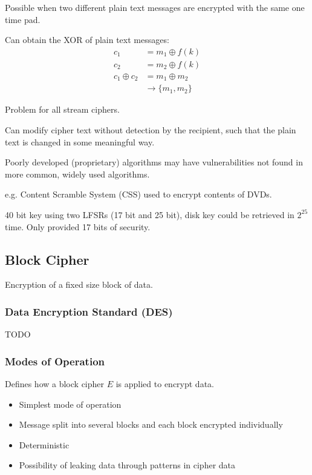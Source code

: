 \documentclass[a4paper]{article}
\begin{document}

Possible when two different plain text messages are encrypted with the same one
time pad.

Can obtain the XOR of plain text messages:
\begin{align*}
               c_{1} &= m_{1} \oplus f(k) \\
               c_{2} &= m_{2} \oplus f(k) \\
  c_{1} \oplus c_{2} &= m_{1} \oplus m_{2} \\
                     &\rightarrow \{m_{1}, m_{2}\}
\end{align*}


Problem for all stream ciphers.

Can modify cipher text without detection by the recipient, such that the plain
text is changed in some meaningful way.


Poorly developed (proprietary) algorithms may have vulnerabilities not found in
more common, widely used algorithms.

e.g. Content Scramble System (CSS) used to encrypt contents of DVDs.

40 bit key using two LFSRs (17 bit and 25 bit), disk key could be retrieved in
$2^{25}$ time. Only provided 17 bits of security.

\subsection{Block Cipher}

Encryption of a fixed size block of data.

\subsubsection{Data Encryption Standard (DES)}

TODO

\subsubsection{Modes of Operation}

Defines how a block cipher $E$ is applied to encrypt data.


\begin{itemize}
  \item Simplest mode of operation
  \item Message split into several blocks and each block encrypted individually
  \item Deterministic
  \item Possibility of leaking data through patterns in cipher data
\end{itemize}
\end{document}
